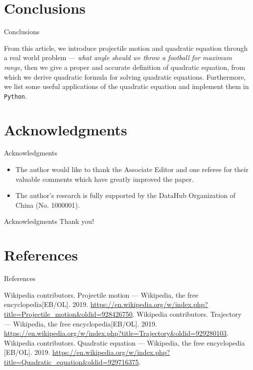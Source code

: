 \section{Conclusions}
\begin{frame}[t]{Conclusions}
    \begin{block}{}
        From this article, we introduce projectile motion and quadratic equation through a real world problem --- \emph{what angle should we throw a football for maximum range}, then we give a proper and accurate definition of quadratic equation, from which we derive quadratic formula for solving quadratic equations. Furthermore, we list some useful applications of the quadratic equation and implement them in \texttt{Python}.
    \end{block}
\end{frame}



\section*{Acknowledgments}
\begin{frame}[t]{Acknowledgments}
    \begin{itemize}
        \item The author would like to thank the Associate Editor and one referee for their valuable comments which have greatly improved the paper.
        \item The author’s research is fully supported by the DataHub Organization of China (No. 1000001).
    \end{itemize}
\end{frame}

\begin{frame}{Acknowledgments}
    \centering\Huge Thank you!
\end{frame}



\section*{References}
\begin{frame}[t]{References}
	\begin{thebibliography}{9}\large
         Wikipedia contributors. Projectile motion — Wikipedia, the free encyclopedia[EB/OL]. 2019. \url{https://en.wikipedia.org/w/index.php?title=Projectile_motion&oldid=928426750}.
         Wikipedia contributors. Trajectory — Wikipedia, the free encyclopedia[EB/OL]. 2019. \url{https://en.wikipedia.org/w/index.php?title=Trajectory&oldid=929280103}.
         Wikipedia contributors. Quadratic equation — Wikipedia, the free encyclopedia [EB/OL]. 2019. \url{https://en.wikipedia.org/w/index.php?title=Quadratic_equation&oldid=929716375}.
    \end{thebibliography}
\end{frame}
